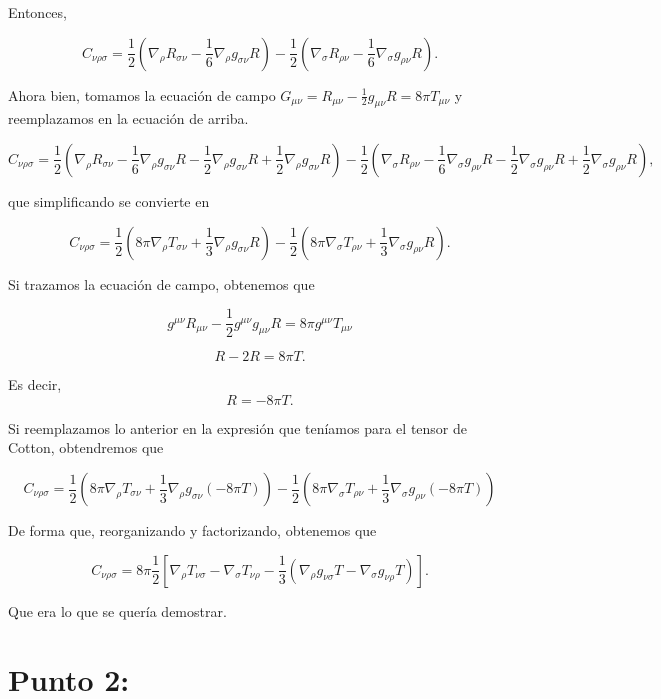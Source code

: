 \documentclass[11pt]{article}
\begin{document}
Entonces,

    \[C_{\nu\rho\sigma}= \frac{1}{2}\left(\nabla_\rho R_{\sigma\nu}-\frac{1}{6}\nabla_\rho g_{\sigma\nu}R\right) - \frac{1}{2}\left(\nabla_\sigma R_{\rho\nu}-\frac{1}{6}\nabla_\sigma g_{\rho\nu}R\right).\]

    Ahora bien, tomamos la ecuación de campo
\(G_{\mu\nu}=R_{\mu\nu}-\frac{1}{2}g_{\mu\nu}R = 8\pi T_{\mu\nu}\) y
reemplazamos en la ecuación de arriba.

\[C_{\nu\rho\sigma}= \frac{1}{2}\left(\nabla_\rho R_{\sigma\nu}-\frac{1}{6}\nabla_\rho g_{\sigma\nu}R-\frac{1}{2}\nabla_\rho g_{\sigma\nu}R+\frac{1}{2}\nabla_\rho g_{\sigma\nu}R\right) - \frac{1}{2}\left(\nabla_\sigma R_{\rho\nu}-\frac{1}{6}\nabla_\sigma g_{\rho\nu}R-\frac{1}{2}\nabla_\sigma g_{\rho\nu}R+\frac{1}{2}\nabla_\sigma g_{\rho\nu}R\right),\]

que simplificando se convierte en

    \[C_{\nu\rho\sigma} = \frac{1}{2}\left(8\pi\nabla_\rho T_{\sigma\nu}+\frac{1}{3}\nabla_\rho g_{\sigma\nu}R\right)-\frac{1}{2}\left(8\pi\nabla_\sigma T_{\rho\nu}+\frac{1}{3}\nabla_\sigma g_{\rho\nu}R\right).\]

    Si trazamos la ecuación de campo, obtenemos que

\[g^{\mu\nu}R_{\mu\nu} - \frac{1}{2}g^{\mu\nu}g_{\mu\nu}R = 8\pi g^{\mu\nu}T_{\mu\nu}\]

\[R-2R = 8\pi T.\]

Es decir, \[R=-8\pi T.\]

    Si reemplazamos lo anterior en la expresión que teníamos para el tensor
de Cotton, obtendremos que

\[C_{\nu\rho\sigma} = \frac{1}{2}\left(8\pi\nabla_\rho T_{\sigma\nu}+\frac{1}{3}\nabla_\rho g_{\sigma\nu}(-8\pi T)\right)-\frac{1}{2}\left(8\pi\nabla_\sigma T_{\rho\nu}+\frac{1}{3}\nabla_\sigma g_{\rho\nu}(-8\pi T)\right)\]

De forma que, reorganizando y factorizando, obtenemos que

\[C_{\nu\rho\sigma}=8\pi\frac{1}{2}\left[\nabla_\rho T_{\nu\sigma}-\nabla_\sigma T_{\nu\rho}-\frac{1}{3}(\nabla_\rho g_{\nu\sigma}T - \nabla_\sigma g_{\nu\rho}T)\right].\]

Que era lo que se quería demostrar.

    \section{Punto 2:}\label{punto-2}
\end{document}
